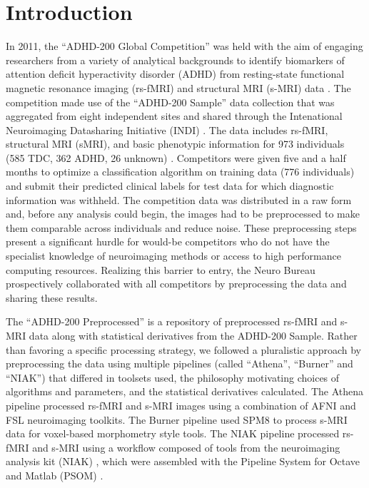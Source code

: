 \documentclass[preprint,12pt,5p]{elsarticle}
\begin{document}
\section{Introduction}

In 2011, the ``ADHD-200 Global Competition'' was held with the aim of engaging researchers from a variety of analytical backgrounds to identify biomarkers of attention deficit hyperactivity disorder (ADHD) from resting-state functional magnetic resonance imaging (rs-fMRI) and structural MRI (s-MRI) data \cite{Milham2012}. The competition made use of the ``ADHD-200 Sample'' data collection that was aggregated from eight independent sites and shared through the Intenational Neuroimaging Datasharing Initiative (INDI) \cite{Mennes2013}. The data includes rs-fMRI, structural MRI (sMRI), and basic phenotypic information for 973 individuals (585 TDC, 362 ADHD, 26 unknown) \cite{Milham2012}. Competitors were given five and a half months to optimize a classification algorithm on training data (776 individuals) and submit their predicted clinical labels for test data for which diagnostic information was withheld. The competition data was distributed in a raw form and, before any analysis could begin, the images had to be preprocessed to make them comparable across individuals and reduce noise. These preprocessing steps present a significant hurdle for would-be competitors who do not have the specialist knowledge of neuroimaging methods or access to high performance computing resources. Realizing this barrier to entry, the Neuro Bureau prospectively collaborated with all competitors by preprocessing the data and sharing these results.

The ``ADHD-200 Preprocessed'' is a repository of preprocessed rs-fMRI and s-MRI data along with statistical derivatives from the ADHD-200 Sample. Rather than favoring a specific processing strategy, we followed a pluralistic approach by preprocessing the data using multiple pipelines (called ``Athena'', ``Burner'' and ``NIAK'') that differed in toolsets used, the philosophy motivating choices of algorithms and parameters, and the statistical derivatives calculated. The Athena pipeline processed rs-fMRI and s-MRI images using a combination of AFNI \cite{cox1996afni} and FSL \cite{smith2004advances} neuroimaging toolkits. The Burner pipeline used SPM8 \cite{ashburner2012spm8} to process s-MRI data for voxel-based morphometry style tools. The NIAK pipeline processed rs-fMRI and s-MRI using a workflow composed of tools from the neuroimaging analysis kit (NIAK) \cite{Bellec2011}, which were assembled with the Pipeline System for Octave and Matlab (PSOM) \cite{Bellec2012}. 
\end{document}
